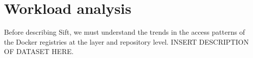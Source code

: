 \section{Workload analysis}
\label{sec:dataset-analysis}

%
%

%
Before describing Sift, we must understand the trends in the access patterns of the Docker registries at the layer and repository level. INSERT DESCRIPTION OF DATASET HERE.

%

